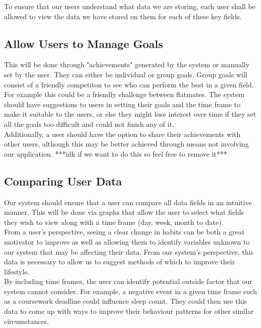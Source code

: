 \documentclass[12pt]{article}
\begin{document}
To ensure that our users understand what data we are storing, each user shall be allowed to view the data we have stored on them for each of these key fields.\newline

\subsection{Allow Users to Manage Goals}
This will be done through "achievements" generated by the system or manually set by the user. They can either be individual or group goals. Group goals will consist of a friendly competiton to see who can perform the best in a given field. For example this could be a friendly challenge between flatmates. The system should have suggestions to users in setting their goals and the time frame to make it suitable to the users, or else they might lose interest over time if they set all the goals too difficult and could not finish any of it.\\ 

Additionally, a user should have the option to share their achievements with other users, although this may be better achieved through means not involving our application.
***idk if we want to do this so feel free to remove it***\\ 
    
\subsection{Comparing User Data}
Our system should ensure that a user can compare all data fields in an intuitive manner. This will be done via graphs that allow the user to select what fields they wish to view along with a time frame (day, week, month to date).\\

From a user's perspective, seeing a clear change in habits can be both a great motivator to improve as well as allowing them to identify variables unknown to our system that may be affecting their data. From our system's perspective, this data is necessary to allow us to suggest methods of which to improve their lifestyle.\\ 

By including time frames, the user can identify potential outside factor that our system cannot consider. For example, a negative event in a given time frame such as a coursework deadline could influence sleep count. They could then use this data to come up with ways to improve their behaviour patterns for other similar circumstances.\\ 
\end{document}
